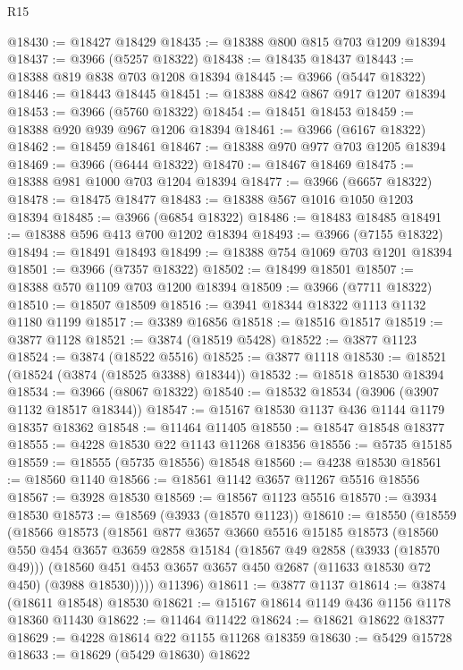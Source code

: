 \begin{lexlean}{R15}
\begin{coremodule}
@18430 := @18427 @18429
@18435 := @18388 @800 @815 @703 @1209 @18394
@18437 := @3966 (@5257 @18322)
@18438 := @18435 @18437
@18443 := @18388 @819 @838 @703 @1208 @18394
@18445 := @3966 (@5447 @18322)
@18446 := @18443 @18445
@18451 := @18388 @842 @867 @917 @1207 @18394
@18453 := @3966 (@5760 @18322)
@18454 := @18451 @18453
@18459 := @18388 @920 @939 @967 @1206 @18394
@18461 := @3966 (@6167 @18322)
@18462 := @18459 @18461
@18467 := @18388 @970 @977 @703 @1205 @18394
@18469 := @3966 (@6444 @18322)
@18470 := @18467 @18469
@18475 := @18388 @981 @1000 @703 @1204 @18394
@18477 := @3966 (@6657 @18322)
@18478 := @18475 @18477
@18483 := @18388 @567 @1016 @1050 @1203 @18394
@18485 := @3966 (@6854 @18322)
@18486 := @18483 @18485
@18491 := @18388 @596 @413 @700 @1202 @18394
@18493 := @3966 (@7155 @18322)
@18494 := @18491 @18493
@18499 := @18388 @754 @1069 @703 @1201 @18394
@18501 := @3966 (@7357 @18322)
@18502 := @18499 @18501
@18507 := @18388 @570 @1109 @703 @1200 @18394
@18509 := @3966 (@7711 @18322)
@18510 := @18507 @18509
@18516 := @3941 @18344 @18322 @1113 @1132 @1180 @1199
@18517 := @3389 @16856
@18518 := @18516 @18517
@18519 := @3877 @1128
@18521 := @3874 (@18519 @5428)
@18522 := @3877 @1123
@18524 := @3874 (@18522 @5516)
@18525 := @3877 @1118
@18530 := @18521 (@18524 (@3874 (@18525 @3388) @18344))
@18532 := @18518 @18530 @18394
@18534 := @3966 (@8067 @18322)
@18540 := @18532 @18534 (@3906 (@3907 @1132 @18517 @18344))
@18547 := @15167 @18530 @1137 @436 @1144 @1179 @18357 @18362
@18548 := @11464 @11405
@18550 := @18547 @18548 @18377
@18555 := @4228 @18530 @22 @1143 @11268 @18356
@18556 := @5735 @15185
@18559 := @18555 (@5735 @18556) @18548
@18560 := @4238 @18530
@18561 := @18560 @1140
@18566 := @18561 @1142 @3657 @11267 @5516 @18556
@18567 := @3928 @18530
@18569 := @18567 @1123 @5516
@18570 := @3934 @18530
@18573 := @18569 (@3933 (@18570 @1123))
@18610 := @18550
    (@18559
      (@18566
        @18573
        (@18561
          @877
          @3657
          @3660
          @5516
          @15185
          @18573
          (@18560
            @550
            @454
            @3657
            @3659
            @2858
            @15184
            (@18567 @49 @2858 (@3933 (@18570 @49)))
            (@18560 @451 @453 @3657 @3657 @450 @2687 (@11633 @18530 @72 @450) (@3988 @18530)))))
      @11396)
@18611 := @3877 @1137
@18614 := @3874 (@18611 @18548) @18530
@18621 := @15167 @18614 @1149 @436 @1156 @1178 @18360 @11430
@18622 := @11464 @11422
@18624 := @18621 @18622 @18377
@18629 := @4228 @18614 @22 @1155 @11268 @18359
@18630 := @5429 @15728
@18633 := @18629 (@5429 @18630) @18622

\end{coremodule}
\end{lexlean}
